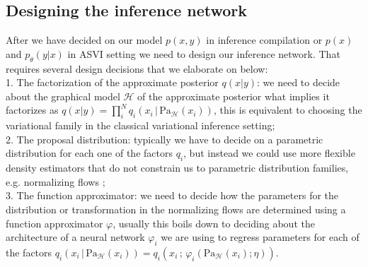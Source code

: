 \documentclass[12pt]{article}
\begin{document}
% 
% 




\subsection{Designing the inference network}
\label{sec:design}

After we have decided on our model $p(x,y)$ in inference compilation or $p(x)$ and $p_\theta(y|x)$ in ASVI setting we need to design our inference network. 
That requires several design decisions that we elaborate on below:\\
1. The factorization of the approximate posterior $q(x|y)$: we need to decide about the graphical model $\mathcal{H}$ of the approximate posterior what implies it factorizes as $q(x|y)=\prod^N_i q_i(x_i\,|\,\text{Pa}_\mathcal{H}(x_i))$, this is equivalent to choosing the variational family in the classical variational inference setting;\\
2. The proposal distribution: typically we have to decide on a parametric distribution for each one of the factors $q_i$, but instead we could use more flexible density estimators that do not constrain us to parametric distribution families, e.g. normalizing flows \citep{RezendeMohamed2015}; \\
3. The function approximator: we need to decide how the parameters for the distribution or transformation in the normalizing flows are determined using a function approximator $\varphi$, usually this boils down to deciding about the architecture of a neural network $\varphi_i$ we are using to regress parameters for each of the factors 
$q_i(x_i\,|\,\text{Pa}_\mathcal{H}(x_i)) = q_i(x_i\,;\,\varphi_i(\text{Pa}_\mathcal{H}(x_i); \eta))$.\\
\end{document}
